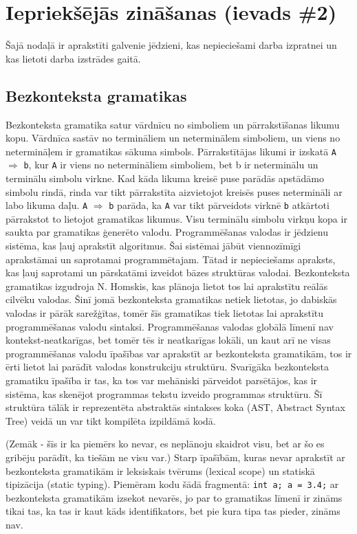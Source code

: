 \section{Iepriekšējās zināšanas (ievads \#2)}
Šajā nodaļā ir aprakstīti galvenie jēdzieni, kas nepieciešami darba izpratnei un kas lietoti darba izstrādes gaitā. 

\subsection{Bezkonteksta gramatikas}
Bezkonteksta gramatika satur vārdnīcu no simboliem un pārrakstīšanas likumu kopu. Vārdnīca sastāv no termināliem un neterminālem simboliem, un viens no netermināļem ir gramatikas sākuma simbols. Pārrakstītājas likumi ir izskatā \verb|A| $\Rightarrow$ \verb|b|, kur \verb|A| ir viens no netermināliem simboliem, bet b ir neterminālu un terminālu simbolu virkne. Kad kāda likuma kreisē puse parādās apstādāmo simbolu rindā, rinda var tikt pārrakstīta aizvietojot kreisēs puses netermināli ar labo likuma daļu. \verb|A| $\Rightarrow$ \verb|b| parāda, ka \verb|A| var tikt pārveidots virknē \verb|b| atkārtoti pārrakstot to lietojot gramatikas likumus. Visu terminālu simbolu virkņu kopa ir saukta par gramatikas ģenerēto valodu. \cite{Shutt:AdaptiveGrammars}
Programmēšanas valodas ir jēdzienu sistēma, kas ļauj aprakstīt algoritmus. Šai sistēmai jābūt viennozīmīgi aprakstāmai un saprotamai programmētajam. Tātad ir nepieciešams apraksts, kas ļauj saprotami un pārskatāmi izveidot bāzes struktūras valodai.
Bezkonteksta gramatikas izgudroja N. Homskis, kas plānoja lietot tos lai aprakstītu reālās cilvēku valodas. Šinī jomā bezkonteksta gramatikas netiek lietotas, jo dabiskās valodas ir pārāk sarežģītas, tomēr šīs gramatikas tiek lietotas lai aprakstītu programmēšanas valodu sintaksi. Programmēšanas valodas globālā līmenī nav kontekst-neatkarīgas, bet tomēr tēs ir neatkarīgas lokāli, un kaut arī ne visas programmēšanas valodu īpašības var aprakstīt ar bezkonteksta gramatikām, tos ir ērti lietot lai parādīt valodas konstrukciju struktūru.
Svarīgāka bezkonteksta gramatiku īpašība ir tas, ka tos var mehāniski pārveidot parsētājos, kas ir sistēma, kas skenējot programmas tekstu izveido programmas struktūru. Šī struktūra tālāk ir reprezentēta abstraktās sintakses koka (AST, Abstract Syntax Tree) veidā un  var tikt kompilēta izpildāmā kodā. \cite{Hopcroft:IntroAutomataTheory}


(Zemāk - šīs ir ka piemērs ko nevar, es neplānoju skaidrot visu, bet ar šo es gribēju parādīt, ka tiešām ne visu var.)
Starp īpašībām, kuras nevar aprakstīt ar bezkonteksta gramatikām ir leksiskais tvērums (lexical scope) un statiskā tipizācija (static typing).
 Piemēram kodu šādā fragmentā: \verb|int a; a = 3.4;| ar bezkonteksta gramatikām izsekot nevarēs, jo par to gramatikas līmenī ir zināms tikai tas, ka tas ir kaut kāds identifikators, bet pie kura tipa tas pieder, zināms nav.

